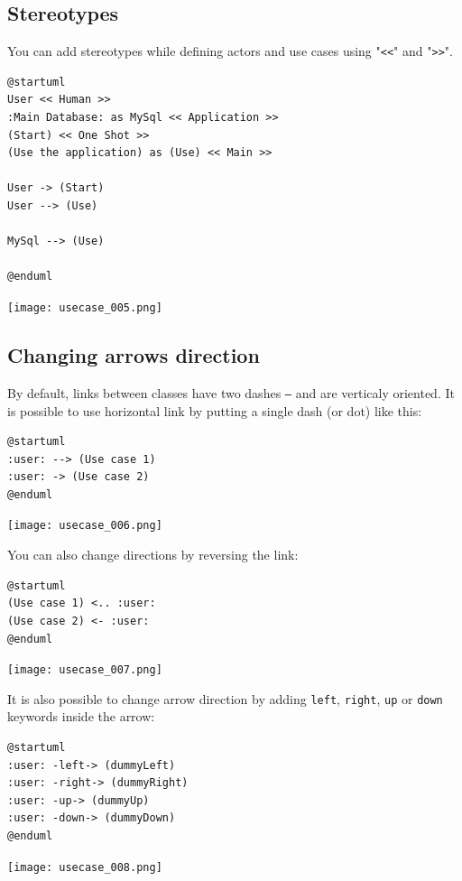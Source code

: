 \newpage \subsection{Stereotypes}

You can add stereotypes while defining actors and use cases using "\texttt{<<}" and "\texttt{>>}".

\begin{lstlisting}
@startuml
User << Human >>
:Main Database: as MySql << Application >>
(Start) << One Shot >>
(Use the application) as (Use) << Main >>

User -> (Start)
User --> (Use)

MySql --> (Use)

@enduml
\end{lstlisting}
\begin{center}
\texttt{[image: usecase\_005.png]}
\end{center}

\newpage \subsection{Changing arrows direction}

By default, links between classes have two dashes \texttt{--} and are verticaly
oriented. It is possible to use horizontal link by putting a single dash (or dot) like this:
\begin{lstlisting}
@startuml
:user: --> (Use case 1)
:user: -> (Use case 2)
@enduml
\end{lstlisting}
\begin{center}
\texttt{[image: usecase\_006.png]}
\end{center}

You can also change directions by reversing the link:
\begin{lstlisting}
@startuml
(Use case 1) <.. :user:
(Use case 2) <- :user:
@enduml
\end{lstlisting}
\begin{center}
\texttt{[image: usecase\_007.png]}
\end{center}

It is also possible to change arrow direction by adding \texttt{left},
\texttt{right}, \texttt{up} or \texttt{down} keywords inside the arrow:
\begin{lstlisting}
@startuml
:user: -left-> (dummyLeft) 
:user: -right-> (dummyRight) 
:user: -up-> (dummyUp)
:user: -down-> (dummyDown)
@enduml
\end{lstlisting}
\begin{center}
\texttt{[image: usecase\_008.png]}
\end{center}

